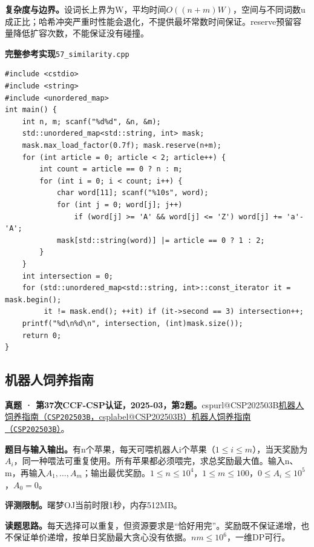 \documentclass[UTF8,11pt,a4paper,fontset=none]{ctexart}
\makeatletter
\newcommand{\csp}[2]{\ifcsname cspurl@#1\endcsname\href{\csname cspurl@#1\endcsname}{#2（\texttt{#1}，\csname csplabel@#1\endcsname）}\else\href{https://oj.shumeng.tech/p/#1}{#2（\texttt{#1}）}\fi}
\makeatother
\begin{document}
\noindent\textbf{复杂度与边界。}设词长上界为W，平均时间$O((n+m)W)$，空间与不同词数u成正比；哈希冲突严重时性能会退化，不提供最坏常数时间保证。reserve预留容量降低扩容次数，不能保证没有碰撞。
\par\noindent\begin{minipage}{\linewidth}
\textbf{完整参考实现}\quad\texttt{57\_similarity.cpp}
\begin{lstlisting}
#include <cstdio>
#include <string>
#include <unordered_map>
int main() {
    int n, m; scanf("%d%d", &n, &m);
    std::unordered_map<std::string, int> mask;
    mask.max_load_factor(0.7f); mask.reserve(n+m);
    for (int article = 0; article < 2; article++) {
        int count = article == 0 ? n : m;
        for (int i = 0; i < count; i++) {
            char word[11]; scanf("%10s", word);
            for (int j = 0; word[j]; j++)
                if (word[j] >= 'A' && word[j] <= 'Z') word[j] += 'a'-'A';
            mask[std::string(word)] |= article == 0 ? 1 : 2;
        }
    }
    int intersection = 0;
    for (std::unordered_map<std::string, int>::const_iterator it = mask.begin();
         it != mask.end(); ++it) if (it->second == 3) intersection++;
    printf("%d\n%d\n", intersection, (int)mask.size());
    return 0;
}
\end{lstlisting}
\end{minipage}\par

\subsection{机器人饲养指南}
\textbf{真题 · 第37次CCF-CSP认证，2025-03，第2题。}\csp{CSP202503B}{机器人饲养指南}。

\noindent\textbf{题目与输入输出。}有n个苹果，每天可喂机器人i个苹果（$1\le i\le m$），当天奖励为$A_i$，同一种喂法可重复使用。所有苹果都必须喂完，求总奖励最大值。输入n、m，再输入$A_1,\ldots,A_m$；输出最优奖励。$1\le n\le10^4$，$1\le m\le100$，$0\le A_i\le10^5$，$A_0=0$。

\noindent\textbf{评测限制。}曙梦OJ当前时限1秒，内存512MB。

\noindent\textbf{读题思路。}每天选择可以重复，但资源要求是“恰好用完”。奖励既不保证递增，也不保证单价递增，按单日奖励最大贪心没有依据。$nm\le10^6$，一维DP可行。
\end{document}
